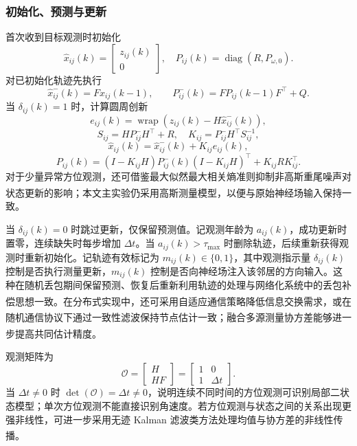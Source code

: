 \documentclass[UTF8,fontset=windows,11pt]{ctexart}
\newcommand{\upcite}[1]{\textsuperscript{\cite{#1}}}
\begin{document}
\subsubsection{初始化、预测与更新}
首次收到目标观测时初始化
\begin{equation}
 \hat x_{ij}(k)=\begin{bmatrix}z_{ij}(k)\\0\end{bmatrix},
 \quad P_{ij}(k)=\operatorname{diag}(R,P_{\omega,0}).
\end{equation}
对已初始化轨迹先执行
\begin{equation}
 \hat x^-_{ij}(k)=F\hat x_{ij}(k-1),\qquad
 P^-_{ij}(k)=FP_{ij}(k-1)F^\top+Q.
\end{equation}
当 $\delta_{ij}(k)=1$ 时，计算圆周创新
\begin{equation}
 e_{ij}(k)=\operatorname{wrap}\left(z_{ij}(k)-H\hat x^-_{ij}(k)\right),
\end{equation}
\begin{equation}
 S_{ij}=HP^-_{ij}H^\top+R,\quad K_{ij}=P^-_{ij}H^\top S_{ij}^{-1},
\end{equation}
\begin{equation}
 \hat x_{ij}(k)=\hat x^-_{ij}(k)+K_{ij}e_{ij}(k),
\end{equation}
\begin{equation}
 P_{ij}(k)=(I-K_{ij}H)P^-_{ij}(k)(I-K_{ij}H)^\top+K_{ij}RK_{ij}^\top.
\end{equation}
对于少量异常方位观测，还可借鉴最大似然最大相关熵准则抑制非高斯重尾噪声对状态更新的影响\upcite{ZhangBearing2025}；本文主实验仍采用高斯测量模型，以便与原始神经场输入保持一致。

当 $\delta_{ij}(k)=0$ 时跳过更新，仅保留预测值。记观测年龄为 $a_{ij}(k)$，成功更新时置零，连续缺失时每步增加 $\Delta t$。当 $a_{ij}(k)>\tau_{\max}$ 时删除轨迹，后续重新获得观测时重新初始化。记轨迹有效标记为 $m_{ij}(k)\in\{0,1\}$，其中观测指示量 $\delta_{ij}(k)$ 控制是否执行测量更新，$m_{ij}(k)$ 控制是否向神经场注入该邻居的方向输入。这种在随机丢包期间保留预测、恢复后重新利用轨迹的处理与网络化系统中的丢包补偿思想一致\upcite{Yu2024}。在分布式实现中，还可采用自适应通信策略降低信息交换需求\upcite{Selvi2025}，或在随机通信协议下通过一致性滤波保持节点估计一致\upcite{Zhou2025}；融合多源测量协方差能够进一步提高共同估计精度\upcite{Yang2025}。

观测矩阵为
\begin{equation}
 \mathcal O=\begin{bmatrix}H\\HF\end{bmatrix}=\begin{bmatrix}1&0\\1&\Delta t\end{bmatrix}.
\end{equation}
当 $\Delta t\ne0$ 时 $\det(\mathcal O)=\Delta t\ne0$，说明连续不同时间的方位观测可识别局部二状态模型；单次方位观测不能直接识别角速度。若方位观测与状态之间的关系出现更强非线性，可进一步采用无迹 Kalman 滤波类方法处理均值与协方差的非线性传播\upcite{Rong2024}。
\end{document}
